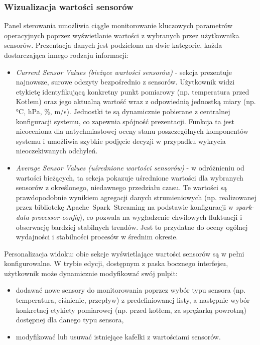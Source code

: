 \subsubsection{Wizualizacja wartości sensorów}
Panel sterowania umożliwia ciągłe monitorowanie kluczowych parametrów operacyjnych poprzez wyświetlanie wartości z wybranych przez użytkownika sensorów. Prezentacja danych jest podzielona na dwie kategorie, każda dostarczająca innego rodzaju informacji:
\vspace{0.3em}
\begin{itemize}
    \item \textit{Current Sensor Values (bieżące wartości sensorów)} - sekcja prezentuje najnowsze, surowe odczyty bezpośrednio z sensorów. Użytkownik widzi etykietę identyfikującą konkretny punkt pomiarowy (np. temperatura przed Kotłem) oraz jego aktualną wartość wraz z odpowiednią jednostką miary (np. °C, hPa, \%, m/s). Jednostki te są dynamicznie pobierane z centralnej konfiguracji systemu, co zapewnia spójność prezentacji. Funkcja ta jest nieoceniona dla natychmiastowej oceny stanu poszczególnych komponentów systemu i umożliwia szybkie podjęcie decyzji w przypadku wykrycia nieoczekiwanych odchyleń.
    \item \textit{Average Sensor Values (uśrednione wartości sensorów)} - w odróżnieniu od wartości bieżących, ta sekcja pokazuje uśrednione wartości dla wybranych sensorów z określonego, niedawnego przedziału czasu. Te wartości są prawdopodobnie wynikiem agregacji danych strumieniowych (np. realizowanej przez bibliotekę \mbox{Apache Spark Streaming} na podstawie konfiguracji w \textit{spark-data-processor-config}), co pozwala na wygładzenie chwilowych fluktuacji i obserwację bardziej stabilnych trendów. Jest to przydatne do oceny ogólnej wydajności i stabilności procesów w średnim okresie.
\end{itemize}
\vspace{0.3em}
Personalizacja widoku: obie sekcje wyświetlające wartości sensorów są w pełni konfigurowalne. W trybie edycji, dostępnym z paska bocznego interfejsu, użytkownik może dynamicznie modyfikować swój pulpit:
\vspace{0.3em}
\begin{itemize}
    \item dodawać nowe sensory do monitorowania poprzez wybór typu sensora (np. temperatura, ciśnienie, przepływ) z predefiniowanej listy, a następnie wybór konkretnej etykiety pomiarowej (np. przed kotłem, za sprężarką powrotną) dostępnej dla danego typu sensora,
    \item modyfikować lub usuwać istniejące kafelki z wartościami sensorów.
\end{itemize}
